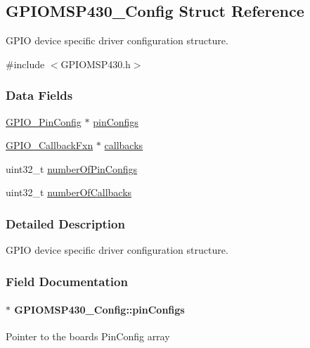 \subsection{G\+P\+I\+O\+M\+S\+P430\+\_\+\+Config Struct Reference}
\label{struct_g_p_i_o_m_s_p430___config}


G\+P\+I\+O device specific driver configuration structure.  




{\ttfamily \#include $<$G\+P\+I\+O\+M\+S\+P430.\+h$>$}

\subsubsection*{Data Fields}
\begin{DoxyCompactItemize}
\item 
\hyperlink{_g_p_i_o_8h_a7f5d979226db633309b3fdc0f4a8aef6}{G\+P\+I\+O\+\_\+\+Pin\+Config} $\ast$ \hyperlink{struct_g_p_i_o_m_s_p430___config_a553786a23ee5d795a5749070fc77c491}{pin\+Configs}
\item 
\hyperlink{_g_p_i_o_8h_a033bc79f1a530381da2b74711e6b8971}{G\+P\+I\+O\+\_\+\+Callback\+Fxn} $\ast$ \hyperlink{struct_g_p_i_o_m_s_p430___config_a3d8366dde66ac98a9d22c0d739a2aa2d}{callbacks}
\item 
uint32\+\_\+t \hyperlink{struct_g_p_i_o_m_s_p430___config_a4c7d4c27deac044a06e0f38158f59c71}{number\+Of\+Pin\+Configs}
\item 
uint32\+\_\+t \hyperlink{struct_g_p_i_o_m_s_p430___config_aee73401132265aaad2c10da512093104}{number\+Of\+Callbacks}
\end{DoxyCompactItemize}


\subsubsection{Detailed Description}
G\+P\+I\+O device specific driver configuration structure. 

\subsubsection{Field Documentation}
\paragraph[{pin\+Configs}]{$\ast$ G\+P\+I\+O\+M\+S\+P430\+\_\+\+Config\+::pin\+Configs}\label{struct_g_p_i_o_m_s_p430___config_a553786a23ee5d795a5749070fc77c491}
Pointer to the board\textquotesingle{}s Pin\+Config array 
